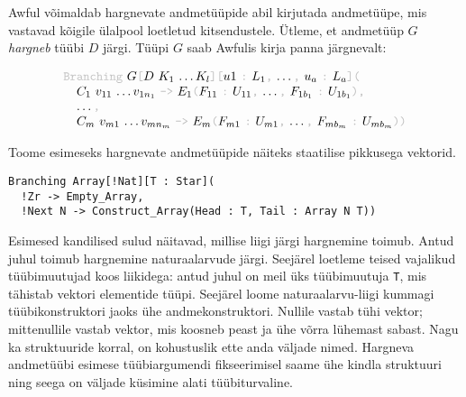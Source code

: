 \documentclass[12pt]{article}
\begin{document}
        Awful võimaldab hargnevate andmetüüpide abil kirjutada andmetüüpe, mis vastavad kõigile ülalpool loetletud kitsendustele. Ütleme, et andmetüüp $G$ \textit{hargneb} tüübi $D$ järgi. Tüüpi $G$ saab Awfulis kirja panna järgnevalt:

        \begin{equation*}
          \begin{tabular}{l}
            {\color{helehall}\verb!Branching!} $G${\color{helehall}\verb![!}$D$ $K_1$ \ldots $K_l${\color{helehall}\verb!][!}$u1$ {\color{helehall}\verb!:!} $L_1${\color{helehall}\verb!,!} \ldots{\color{helehall}\verb!,!} $u_a$ {\color{helehall}\verb!:!} $L_a${\color{helehall}\verb!](!} \\
            \verb!  !$C_1$ $v_{11}$ \ldots $v_{1n_1}$ {\color{helehall}\verb!->!} $E_1${\color{helehall}\verb!(!}$F_{11}$ {\color{helehall}\verb!:!} $U_{11}${\color{helehall}\verb!,!} \ldots{\color{helehall}\verb!,!} $F_{1b_1}$ {\color{helehall}\verb!:!} $U_{1b_1}${\color{helehall}\verb!),!}\\
            \verb!  !\ldots{\color{helehall}\verb!,!}\\
            \verb!  !$C_m$ $v_{m1}$ \ldots $v_{mn_m}$ {\color{helehall}\verb!->!} $E_m${\color{helehall}\verb!(!}$F_{m1}$ {\color{helehall}\verb!:!} $U_{m1}${\color{helehall}\verb!,!} \ldots{\color{helehall}\verb!,!} $F_{mb_m}$ {\color{helehall}\verb!:!} $U_{mb_m}${\color{helehall}\verb!))!}
          \end{tabular}
        \end{equation*}

        Toome esimeseks hargnevate andmetüüpide näiteks staatilise pikkusega vektorid.

        \begin{verbatim}Branching Array[!Nat][T : Star](
  !Zr -> Empty_Array,
  !Next N -> Construct_Array(Head : T, Tail : Array N T))\end{verbatim}

        Esimesed kandilised sulud näitavad, millise liigi järgi hargnemine toimub. Antud juhul toimub hargnemine naturaalarvude järgi. Seejärel loetleme teised vajalikud tüübimuutujad koos liikidega: antud juhul on meil üks tüübimuutuja \verb!T!, mis tähistab vektori elementide tüüpi. Seejärel loome naturaalarvu-liigi kummagi tüübikonstruktori jaoks ühe andmekonstruktori. Nullile vastab tühi vektor; mittenullile vastab vektor, mis koosneb peast ja ühe võrra lühemast sabast. Nagu ka struktuuride korral, on kohustuslik ette anda väljade nimed. Hargneva andmetüübi esimese tüübiargumendi fikseerimisel saame ühe kindla struktuuri ning seega on väljade küsimine alati tüübiturvaline.
\end{document}
